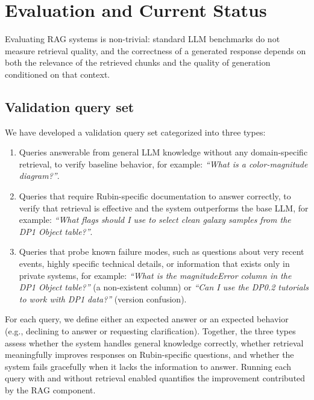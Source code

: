 \section{Evaluation and Current Status}
\label{sec:evaluation}
 
Evaluating \gls{RAG} systems is non-trivial: standard LLM benchmarks do not measure retrieval quality, and the correctness of a generated response depends on both the relevance of the retrieved chunks and the quality of generation conditioned on that context.
 
\subsection{Validation query set}
\label{sec:validation_framework}

We have developed a validation query set categorized into three types:

\begin{enumerate}
\item Queries answerable from general LLM knowledge without any domain-specific retrieval, to verify baseline behavior, for example: \emph{``What is a color-magnitude diagram?''}.
\item Queries that require Rubin-specific documentation to answer correctly, to verify that retrieval is effective and the system outperforms the base LLM, for example: \emph{``What flags should I use to select clean galaxy samples from the \gls{DP1} Object table?''}.
\item Queries that probe known failure modes, such as questions about very recent events, highly specific technical details, or information that exists only in private systems, for example: \emph{``What is the magnitudeError column in the \gls{DP1} Object table?''} (a non-existent column) or \emph{``Can I use the \gls{DP0}.2 tutorials to work with \gls{DP1} data?''} (version confusion).
\end{enumerate}
\noindent
For each query, we define either an expected answer or an expected behavior (e.g., declining to answer or requesting clarification).
Together, the three types assess whether the system handles general knowledge correctly, whether retrieval meaningfully improves responses on Rubin-specific questions, and whether the system fails gracefully when it lacks the information to answer.
Running each query with and without retrieval enabled quantifies the improvement contributed by the \gls{RAG} component.
 
